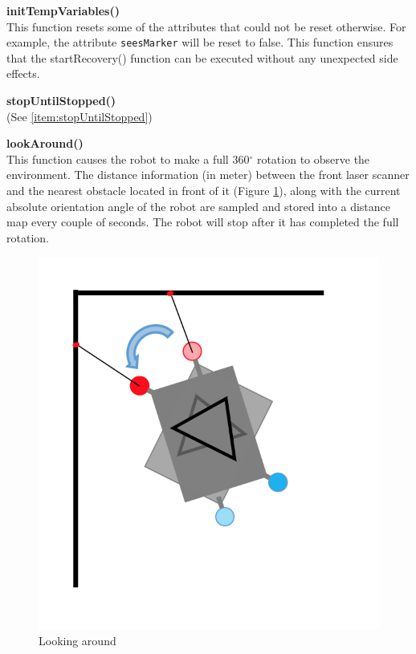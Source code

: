 \begin{description}
\item \textbf{initTempVariables()} \hfill \\
This function resets some of the attributes that could not be reset otherwise. For example, the attribute \texttt{seesMarker} will be reset to false. This function ensures that the startRecovery() function can be executed without any unexpected side effects.

\item \textbf{stopUntilStopped()} \hfill \\
(See \ref{item:stopUntilStopped})

\item \textbf{lookAround()} \hfill \\
This function causes the robot to make a full 360$^{\circ}$ rotation to observe the environment. The distance information (in meter) between the front laser scanner and the nearest obstacle located in front of it (Figure \ref{best}), along with the current absolute orientation angle of the robot are sampled and stored into a distance map every couple of seconds. The robot will stop after it has completed the full rotation.

\begin{figure}[htb]
\centering
\includegraphics[scale=0.5]{graphics/find_best_angle.png}
\caption{Looking around}
\label{best}
\centering
\end{figure}



\end{description}
